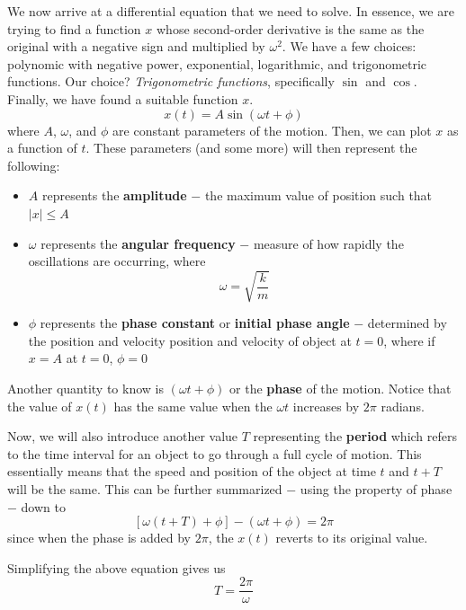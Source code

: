 We now arrive at a differential equation that we need to solve. In essence, we are trying to 
find a function $x$ whose second-order derivative is the same as the original with a negative sign
and multiplied by $\omega^2$.
We have a few choices: polynomic with negative power, exponential, logarithmic, and trigonometric
functions. Our choice? \textit{Trigonometric functions}, specifically $\sin$ and $\cos$. Finally,
we have found a suitable function $x$.
\begin{equation}\label{15.6}
    x(t) = A\sin(\omega t + \phi)
\end{equation} 
where $A$, $\omega$, and $\phi$ are constant parameters of the motion. Then, we can plot $x$ as
a function of $t$. These parameters (and some more) will then represent the following:
\begin{itemize}
    \item $A$ represents the \textbf{amplitude} $-$ the maximum value of position such that $|x|\leq A$
    \item $\omega$ represents the \textbf{angular frequency} $-$ measure of how rapidly the oscillations
        are occurring, where \begin{equation}\label{15.9}
            \omega = \sqrt{\frac{k}{m}}
        \end{equation}
    \item $\phi$ represents the \textbf{phase constant} or \textbf{initial phase angle} $-$
        determined by the position and velocity position and velocity of object at $t=0$, where
        if $x=A$ at $t=0$, $\phi = 0$
\end{itemize}

Another quantity to know is $(\omega t + \phi)$ or the \textbf{phase} of the motion.
Notice that the value of $x(t)$ has the same value when the $\omega t$ increases by $2\pi$ radians.

Now, we will also introduce another value $T$ representing the \textbf{period} which refers to 
the time interval for an object to go through a full cycle of motion. This essentially means that 
the speed and position of the object at time $t$ and $t+T$ will be the same. This can be further
summarized $-$ using the property of phase $-$ down to 
\[ \left[\omega(t + T) + \phi\right] - (\omega t +\phi) = 2\pi \]
since when the phase is added by $2\pi$, the $x(t)$ reverts to its original value.

Simplifying the above equation gives us
\begin{equation}\label{15.10}
    T = \frac{2\pi}{\omega}
\end{equation}

